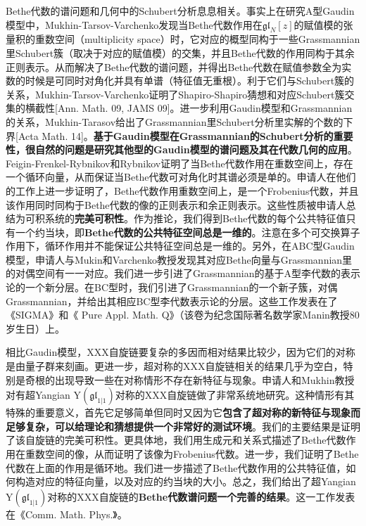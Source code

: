 \documentclass[12pt,UTF8,AutoFakeBold=4,a4paper]{ctexart}
\begin{document}
Bethe代数的谱问题和几何中的Schubert分析息息相关。事实上在研究A型Gaudin模型中，Mukhin-Tarsov-Varchenko发现当Bethe代数作用在$\mathfrak{gl}_N[z]$的赋值模的张量积的重数空间（multiplicity space）时，它对应的概型同构于一些Grassmannian里Schubert簇（取决于对应的赋值模）的交集，并且Bethe代数的作用同构于其余正则表示。从而解决了Bethe代数的谱问题，并得出Bethe代数在赋值参数全为实数的时候是可同时对角化并具有单谱（特征值无重根）。利于它们与Schubert簇的关系，Mukhin-Tarsov-Varchenko证明了Shapiro-Shapiro猜想和对应Schubert簇交集的横截性[Ann. Math. 09, JAMS 09]。进一步利用Gaudin模型和Grassmannian的关系，Mukhin-Tarasov给出了Grassmannian里Schubert分析里实解的个数的下界[Acta Math. 14]。\textbf{基于Gaudin模型在Grassmannian的Schubert分析的重要性，很自然的问题是研究其他型的Gaudin模型的谱问题及其在代数几何的应用}。Feigin-Frenkel-Rybnikov和Rybnikov证明了当Bethe代数作用在重数空间上，存在一个循环向量，从而保证当Bethe代数可对角化时其谱必须是单的。申请人在他们的工作上进一步证明了，Bethe代数作用重数空间上，是一个Frobenius代数，并且该作用同时同构于Bethe代数的像的正则表示和余正则表示。这些性质被申请人总结为可积系统的\textbf{完美可积性}。作为推论，我们得到Bethe代数的每个公共特征值只有一个约当块，即\textbf{Bethe代数的公共特征空间总是一维的}。注意在多个可交换算子作用下，循环作用并不能保证公共特征空间总是一维的。另外，在ABC型Gaudin模型，申请人与Mukin和Varchenko教授发现其对应Bethe向量与Grassmannian里的对偶空间有一一对应。我们进一步引进了Grassmannian的基于A型李代数的表示论的一个新分层。在BC型时，我们引进了Grassmannian的一个新子簇，对偶Grassmannian，并给出其相应BC型李代数表示论的分层。这些工作发表在了《SIGMA》和《 Pure Appl. Math. Q》（该卷为纪念国际著名数学家Manin教授80岁生日）上。

相比Gaudin模型，XXX自旋链要复杂的多因而相对结果比较少，因为它们的对称是由量子群来刻画。更进一步，超对称的XXX自旋链相关的结果几乎为空白，特别是奇根的出现导致一些在对称情形不存在新特征与现象。申请人和Mukhin教授对有超Yangian $\mathrm{Y}(\mathfrak{gl}_{1|1})$对称的XXX自旋链做了非常系统地研究。这种情形有其特殊的重要意义，首先它足够简单但同时又因为它\textbf{包含了超对称的新特征与现象而足够复杂，可以给理论和猜想提供一个非常好的测试环境}。我们的主要结果是证明了该自旋链的完美可积性。更具体地，我们用生成元和关系式描述了Bethe代数作用在重数空间的像，从而证明了该像为Frobenius代数。进一步，我们证明了Bethe代数在上面的作用是循环地。我们进一步描述了Bethe代数作用的公共特征值，如何构造对应的特征向量，以及对应的约当块的大小。总之，我们给出了超Yangian $\mathrm{Y}(\mathfrak{gl}_{1|1})$对称的XXX自旋链的\textbf{Bethe代数谱问题一个完善的结果}。这一工作发表在《Comm. Math. Phys.》。
\end{document}
